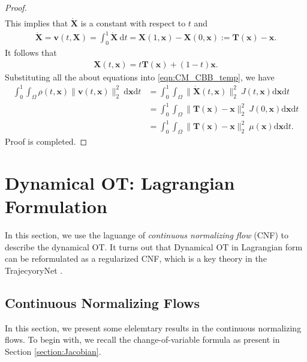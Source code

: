 \documentclass[11pt]{book}
\newcommand{\dx}{\mathrm{d}\mathbf{x}}
\newcommand{\dt}{\mathrm{d}t}
\begin{document}
\begin{proof}
\begin{align*}
    \end{align*}
    This implies that $\dot{\mathbf{X}}$ is a constant with respect to $t$ and
    \begin{align*}
        \dot{\mathbf{X}}=\mathbf{v}(t,\mathbf{X}) = \int_0^1 \dot{\mathbf{X}}\ \dt = \mathbf{X}(1,\mathbf{x}) - \mathbf{X}(0,\mathbf{x}) := \mathbf{T}(\mathbf{x}) - \mathbf{x}.
    \end{align*}
    It follows that 
    \begin{align*}
        \mathbf{X}(t,\mathbf{x}) = t\mathbf{T}(\mathbf{x}) + (1-t)\mathbf{x}.
    \end{align*}
    Substituting all the about equations into \eqref{eqn:CM_CBB_temp}, we have
    \begin{align*}
        \int_0^1 \int_{\Omega} \rho(t,\mathbf{x}) \|\mathbf{v}(t,\mathbf{x})\|_2^2 \ \dx\dt
        & = \int_0^1 \int_{\Omega}  \|\dot{\mathbf{X}}(t,\mathbf{x})\|_2^2 \ J(t,\mathbf{x})\mathrm{d}\mathbf{x}\dt\\
        & = \int_0^1 \int_{\Omega}  \|\mathbf{T}(\mathbf{x})-\mathbf{x}\|_2^2 \ J(0,\mathbf{x})\mathrm{d}\mathbf{x}\dt \\
        & = \int_0^1 \int_{\Omega}  \|\mathbf{T}(\mathbf{x})-\mathbf{x}\|_2^2 \ \mu(\mathbf{x})\mathrm{d}\mathbf{x}\dt. 
    \end{align*}
    Proof is completed.
\end{proof}




\section[Lagrangian Form]{Dynamical OT: Lagrangian Formulation}

In this section, we use the laguange of {\it continuous normalizing flow} (CNF) to describe the dynamical OT. It turns out that Dynamical OT in Lagrangian form can be reformulated as a regularized CNF, which is a key theory in the TrajecyoryNet \cite{tong2020trajectorynet}.

\subsection{Continuous Normalizing Flows}

In this section, we present some elelemtary results in the continuous normalizing flows. To begin with, we recall the change-of-variable formula  as present in Section \ref{section:Jacobian}.
\end{document}

